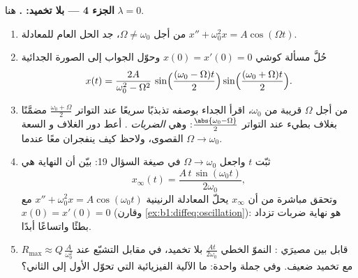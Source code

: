 \begin{problem}
\medskip
\noindent\textbf{الجزء 4 --- بلا تخميد:  .}
هنا $\lambda = 0$.
\begin{enumerate}[resume]
  \item من أجل $\Omega \neq \omega_0$، جد الحل العام للمعادلة
        $x'' + \omega_0^2 x = A\cos(\Omega t)$.
  \item حُلَّ مسألة كوشي $x(0) = x'(0) = 0$ وحوّل
        الجواب إلى الصورة الجدائية
        \[
        x(t) = \frac{2A}{\omega_0^2 - \Omega^2}\,
        \sin\Bigl(\frac{(\omega_0 - \Omega)t}2\Bigr)
        \sin\Bigl(\frac{(\omega_0 + \Omega)t}2\Bigr) .
        \]
  \item من أجل $\Omega$ قريبة من $\omega_0$، اقرأ الجداء بوصفه
        تذبذبًا سريعًا عند التواتر $\frac{\omega_0 + \Omega}2$
        مضمَّنًا بغلاف بطيء عند التواتر
        $\frac{\abs{\omega_0 - \Omega}}2$: وهي \emph{الضربات}
        . أعط دور الغلاف و
        السعة القصوى، ولاحظ كيف ينفجران معًا عندما $\Omega
        \to \omega_0$.
  \item ثبّت $t$ واجعل $\Omega \to \omega_0$ في صيغة السؤال 19:
        بيّن أن النهاية هي
        \[
        x_\infty(t) = \frac{A\,t\,\sin(\omega_0 t)}{2\omega_0} ,
        \]
        وتحقق مباشرة من أن $x_\infty$ يحلّ المعادلة
        الرنينية $x'' + \omega_0^2 x = A\cos(\omega_0 t)$ مع
        $x(0) = x'(0) = 0$ (وقارن
        \cref{ex:b1:diffeq:oscillation}):  هو نهاية
        ضربات تزداد بطئًا واتساعًا أبدًا.
  \item قابل بين مصيرَي : النموّ الخطي
        $\frac{At}{2\omega_0}$ بلا تخميد، في مقابل التشبّع
        عند $R_{\max} \approx Q\,\frac{A}{\omega_0^2}$ مع تخميد
        ضعيف. وفي جملة واحدة: ما الآلية الفيزيائية التي تحوّل
        الأول إلى الثاني؟
\end{enumerate}


\end{problem}
